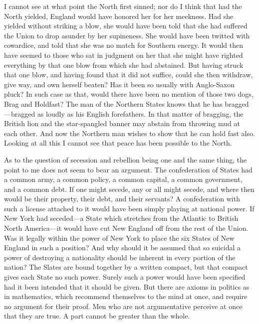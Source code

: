 I cannot see at what point the North first sinned; nor do I think
that had the North yielded, England would have honored her for her
meekness.  Had she yielded without striking a blow, she would have
been told that she had suffered the Union to drop asunder by her
supineness.  She would have been twitted with cowardice, and told
that she was no match for Southern energy.  It would then have
seemed to those who sat in judgment on her that she might have
righted everything by that one blow from which she had abstained.
But having struck that one blow, and having found that it did not
suffice, could she then withdraw, give way, and own herself beaten?
Has it been so usually with Anglo-Saxon pluck?  In such case as
that, would there have been no mention of those two dogs, Brag and
Holdfast?  The man of the Northern States knows that he has
bragged---bragged as loudly as his English forefathers.  In that
matter of bragging, the British lion and the star-spangled banner
may abstain from throwing mud at each other.  And now the Northern
man wishes to show that he can hold fast also.  Looking at all this
I cannot see that peace has been possible to the North.

As to the question of secession and rebellion being one and the
same thing, the point to me does not seem to bear an argument.  The
confederation of States had a common army, a common policy, a
common capital, a common government, and a common debt.  If one
might secede, any or all might secede, and where then would be
their property, their debt, and their servants?  A confederation
with such a license attached to it would have been simply playing
at national power.  If New York had seceded---a State which
stretches from the Atlantic to British North America---it would have
cut New England off from the rest of the Union.  Was it legally
within the power of New York to place the six States of New England
in such a position?  And why should it be assumed that so suicidal
a power of destroying a nationality should be inherent in every
portion of the nation?  The Slates are bound together by a written
compact, but that compact gives each State no such power.  Surely
such a power would have been specified had it been intended that it
should be given.  But there are axioms in politics as in
mathematics, which recommend themselves to the mind at once, and
require no argument for their proof.  Men who are not argumentative
perceive at once that they are true.  A part cannot be greater than
the whole.

